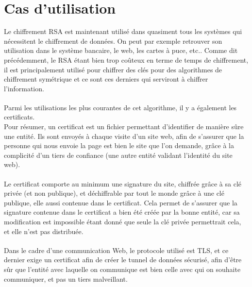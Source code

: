 	\section{Cas d'utilisation}
		Le chiffrement RSA est maintenant utilisé dans quasiment tous les systèmes qui nécessitent le chiffrement de données. On peut par exemple retrouver son utilisation dans le système bancaire, le web, les cartes à puce, etc..
		Comme dit précédemment, le RSA étant bien trop coûteux en terme de temps de chiffrement, il est principalement utilisé pour chiffrer des clés pour des algorithmes de chiffrement symétrique et ce sont ces derniers qui serviront à chiffrer l'information.\\
		\\
		Parmi les utilisations les plus courantes de cet algorithme, il y a également les certificats.\\
		Pour résumer, un certificat est un fichier permettant d'identifier de manière sûre une entité. Ils sont envoyés à chaque visite d'un site web, afin de s'assurer que la personne qui nous envoie la page est bien le site que l'on demande, grâce à la complicité d'un tiers de confiance (une autre entité validant l'identité du site web).\\
		\\
		Le certificat comporte au minimum une signature du site, chiffrée grâce à sa clé privée (et non publique), et déchiffrable par tout le monde grâce à une clé publique, elle aussi contenue dans le certificat. Cela permet de s'assurer que la signature contenue dans le certificat a bien été créée par la bonne entité, car sa modification est impossible étant donné que seule la clé privée permettrait cela, et elle n'est pas distribuée.\\
		\\
		Dans le cadre d'une communication Web, le protocole utilisé est TLS, et ce dernier exige un certificat afin de créer le tunnel de données sécurisé, afin d'être sûr que l'entité avec laquelle on communique est bien celle avec qui on souhaite communiquer, et pas un tiers malveillant.